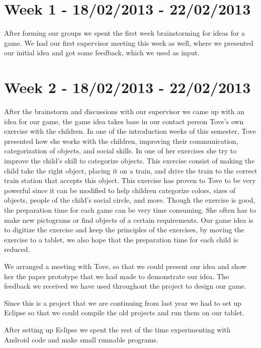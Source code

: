 
\section*{Week 1 - 18/02/2013 - 22/02/2013}

After forming our groups we spent the first week brainstorming for ideas for a game. We had our first supervisor meeting this week as well, where we presented our initial idea and got some feedback, which we used as input. 

\section*{Week 2 - 18/02/2013 - 22/02/2013} 
\label{processweek2}
After the brainstorm and discussions with our supervisor we came up with an idea for our game, the game idea takes base in our contact person Tove's own exercise with the children. In one of the introduction weeks of this semester, Tove presented how she works with the children, improving their communication, categorization of objects, and social skills. In one of her exercises she try to improve the child's skill to categorize objects. This exercise consist of making the child take the right object, placing it on a train, and drive the train to the correct train station that accepts this object. This exercise has proven to Tove to be very powerful since it can be modified to help children categorize colors, sizes of objects, people of the child's social circle, and more. Though the exercise is good, the preparation time for each game can be very time consuming. She often has to make new pictograms or find objects of a certain requirements. Our game idea is to digitize the exercise and keep the principles of the exercises, by moving the exercise to a tablet, we also hope that the preparation time for each child is reduced.

We arranged a meeting with Tove, so that we could present our idea and show her the paper prototype that we had made to demonstrate our idea. The feedback we received we have used throughout the project to design our game. 

Since this is a project that we are continuing from last year we had to set up Eclipse so that we could compile the old projects and run them on our tablet. 

After setting up Eclipse we spent the rest of the time experimenting with Android code and make small runnable programs. 

